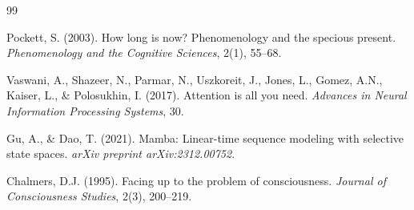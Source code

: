 \documentclass[12pt,a4paper]{article}
\begin{document}
\begin{thebibliography}{99}

Pockett, S. (2003). How long is now? Phenomenology and the specious present. \textit{Phenomenology and the Cognitive Sciences}, 2(1), 55--68.

Vaswani, A., Shazeer, N., Parmar, N., Uszkoreit, J., Jones, L., Gomez, A.N., Kaiser, L., \& Polosukhin, I. (2017). Attention is all you need. \textit{Advances in Neural Information Processing Systems}, 30.

Gu, A., \& Dao, T. (2021). Mamba: Linear-time sequence modeling with selective state spaces. \textit{arXiv preprint arXiv:2312.00752}.

Chalmers, D.J. (1995). Facing up to the problem of consciousness. \textit{Journal of Consciousness Studies}, 2(3), 200--219.

\end{thebibliography}
\end{document}
